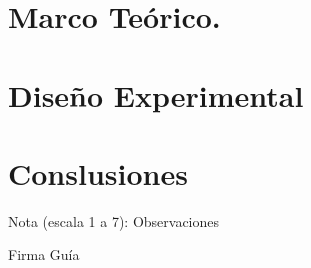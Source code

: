 \documentclass[11pt,letterpaper]{article}
\begin{document}
\section{Marco Teórico.}


\section{Diseño Experimental}



\section{Conslusiones}




\vspace{3cm}


Nota (escala 1 a 7): 
\vspace{3cm}
Observaciones



\centering Firma Guía



    






\newpage











































\end{document}
